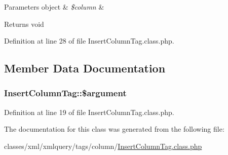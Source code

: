 \begin{DoxyParams}[1]{Parameters}
object & {\em \$column} & \\
\hline
\end{DoxyParams}
\begin{DoxyReturn}{Returns}
void 
\end{DoxyReturn}


Definition at line 28 of file Insert\+Column\+Tag.\+class.\+php.



\subsection{Member Data Documentation}
\subsubsection[{\texorpdfstring{\$argument}{$argument}}]{\setlength{\rightskip}{0pt plus 5cm}Insert\+Column\+Tag\+::\$argument}\hypertarget{classInsertColumnTag_a1aa52b3296f70706efacf27d1a1abc6c}{}\label{classInsertColumnTag_a1aa52b3296f70706efacf27d1a1abc6c}


Definition at line 19 of file Insert\+Column\+Tag.\+class.\+php.



The documentation for this class was generated from the following file\+:\begin{DoxyCompactItemize}
\item 
classes/xml/xmlquery/tags/column/\hyperlink{InsertColumnTag_8class_8php}{Insert\+Column\+Tag.\+class.\+php}\end{DoxyCompactItemize}
